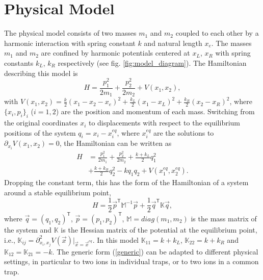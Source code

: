\section{Physical Model \label{sec:Physical_Model}}
%
%
%
%
The physical model consists of two masses $m_1$ and $m_2$ coupled to each other by a harmonic interaction with spring constant $k$ and natural length $x_e$. The masses $m_1$ and $m_2$ are confined by  harmonic potentials centered at $x_L$, $x_R$ with spring constants $k_L$, $k_R$  respectively (see fig. \ref{fig:model_diagram}). The Hamiltonian describing this model is
%
\begin{equation}
  H = \frac{p_1^2}{2m_1} + \frac{p_2^2}{2m_2} + V(x_1,x_2),
  \label{eq:chapter6_HamiltonianOriginalCordinates}
\end{equation}
%
with $V(x_1,x_2)=\frac{k}{2}\left( x_1 - x_2 - x_e \right)^2 + \frac{k_L}{2}\left( x_1 - x_L \right)^2 + \frac{k_R}{2}\left( x_2 - x_R \right)^2$,  where $\{x_i,p_i\}_i$ ($i=1,2$) are the position and momentum of each mass. Switching from the original coordinates $x_i$ to displacements with respect to the equilibrium positions of the system $q_i = x_i - x_i^{eq}$, where $x_i^{eq}$ are the solutions to $\partial_{x_i}V(x_1,x_2)=0$, the Hamiltonian can be written as
%
\begin{align}
  H &= \frac{p_1^2}{2m_1} + \frac{p_2^2}{2m_2} + \frac{k+k_L}{2}q_1^2\nonumber\\ &+ \frac{k+k_R}{2}q_2^2 - k q_1 q_2 + V(x_1^{eq},x_2^{eq}).
  \label{eq:chapter6_Hamiltonian}
\end{align}
%
Dropping the constant term, this has the form of  the Hamiltonian of a system around a stable equilibrium point,
%
\begin{equation}
  H = \frac{1}{2} \overrightarrow{p}^\mathsf{T}\mathbb{M}^{-1}\overrightarrow{p} + \frac{1}{2} \overrightarrow{q}^\mathsf{T}\mathbb{K}\overrightarrow{q},
\label{generic}
\end{equation}
%
where $\overrightarrow{q} = \left(q_1,q_2\right)^\mathsf{T}$, $\overrightarrow{p} = \left(p_1,p_2\right)^\mathsf{T}$, $\mathbb{M} = diag(m_1,m_2)$ is the mass matrix of the system and $\mathbb{K}$ is the Hessian matrix of the potential at the equilibrium point, i.e., $\mathbb{K}_{ij} = \partial^2_{x_i,x_j}V(\overrightarrow{x})\Big|_{\overrightarrow{x} = \overrightarrow{x}^{eq}}$. In this model  $\mathbb{K}_{11} = k + k_L$, $\mathbb{K}_{22} = k + k_R$ and $\mathbb{K}_{12} = \mathbb{K}_{21} = -k$. The generic form (\ref{generic}) can be adapted to different physical settings, in particular to two ions in individual traps, or to two ions in a common trap.


